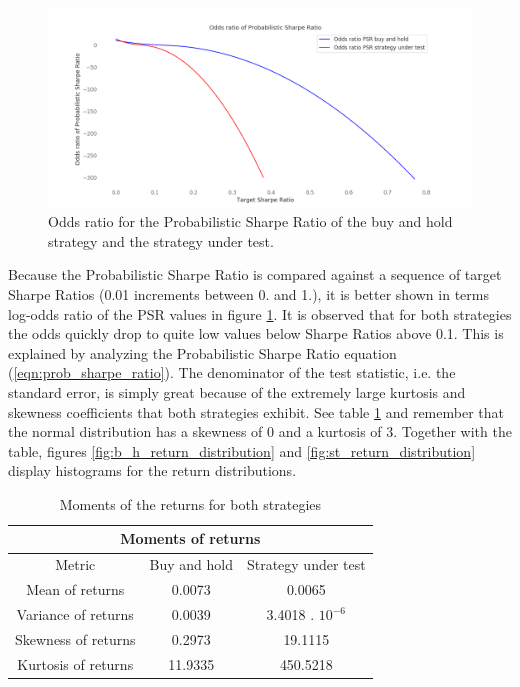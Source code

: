 \begin{figure}[H]
    \centering
    \includegraphics[width=\textwidth]{results/images/log_odds_ratio_psr.png}
    \caption{Odds ratio for the Probabilistic Sharpe Ratio of the buy and hold strategy and the strategy under test.}
    \label{fig:prob_sharpe_ratio}
\end{figure}

Because the Probabilistic Sharpe Ratio is compared against a sequence of target
Sharpe Ratios (0.01 increments between 0. and 1.), it is better shown in terms
log-odds ratio of the PSR values in figure \ref{fig:prob_sharpe_ratio}. It is observed
that for both strategies the odds quickly drop to quite low values below Sharpe
Ratios above 0.1. This is explained by analyzing the Probabilistic Sharpe Ratio
equation (\ref{eqn:prob_sharpe_ratio}). The denominator of the test statistic,
i.e. the standard error, is simply great because of the extremely large kurtosis
and skewness coefficients that both strategies exhibit. See table \ref{table:return_moments}
and remember that the normal distribution has a skewness of 0 and a kurtosis
of 3. Together with the table, figures
\ref{fig:b_h_return_distribution} and \ref{fig:st_return_distribution} display
histograms for the return distributions.

\begin{table}[H]
  \centering
  \begin{tabular}{| c | c | c |} 
    \hline
    \multicolumn{3}{|c|}{Moments of returns} \\
    \hline
    Metric & Buy and hold & Strategy under test \\
    \hline
    Mean of returns & 0.0073 & 0.0065 \\
    \hline
    Variance of returns & 0.0039 & 3.4018 . $10^{-6}$ \\
    \hline
    Skewness of returns & 0.2973 & 19.1115 \\
    \hline
    Kurtosis of returns & 11.9335 & 450.5218 \\
    \hline
  \end{tabular}
  \caption{Moments of the returns for both strategies}
  \label{table:return_moments}
\end{table}

